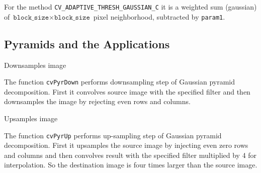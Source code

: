For the method \texttt{CV\_ADAPTIVE\_THRESH\_GAUSSIAN\_C} it is a weighted sum (gaussian) of $\texttt{block\_size} \times \texttt{block\_size}$ pixel neighborhood, subtracted by \texttt{param1}.

\subsection{Pyramids and the Applications}

\label{PyrDown}

Downsamples image


\begin{description}
\end{description}

The function \texttt{cvPyrDown} performs downsampling step of Gaussian pyramid decomposition. First it convolves source image with the specified filter and then downsamples the image by rejecting even rows and columns.

\label{PyrUp}

Upsamples image


\begin{description}
\end{description}

The function \texttt{cvPyrUp} performs up-sampling step of Gaussian pyramid decomposition. First it upsamples the source image by injecting even zero rows and columns and then convolves result with the specified filter multiplied by 4 for interpolation. So the destination image is four times larger than the source image.

